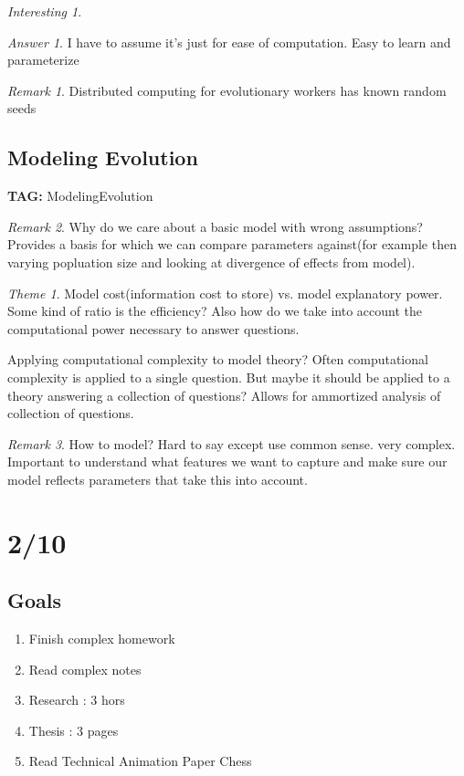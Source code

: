\documentclass[11pt]{article}
\theoremstyle{remark}
\newtheorem{remark}{Remark}
\newtheorem{ans}{Answer}
\newtheorem{interest}{Interesting}
\newtheorem{theme}{Theme}
\begin{document}
\begin{interest}
\begin{ans}
	 I have to assume it's just for ease of computation. Easy to learn and parameterize
\end{ans}

\begin{remark}
	Distributed computing for evolutionary workers has known random seeds
\end{remark}

\subsection{Modeling Evolution}

\textbf{TAG:} ModelingEvolution

\begin{remark}
	Why do we care about a basic model with wrong assumptions? Provides a basis for which we can compare parameters against(for example then varying popluation size and looking at divergence of effects from model).
\end{remark}

\begin{theme}
	Model cost(information cost to store) vs. model explanatory power. Some kind of ratio is the efficiency? Also how do we take into account the computational power necessary to answer questions.

	Applying computational complexity to model theory? Often computational complexity is applied to a single question. But maybe it should be applied to a theory answering a collection of questions? Allows for ammortized analysis of collection of questions.
\end{theme}

\begin{remark}
	How to model? Hard to say except use common sense. very complex. Important to understand what features we want to capture and make sure our model reflects parameters that take this into account.
\end{remark}

\section{2/10}

\subsection{Goals}

\begin{enumerate}
	\item Finish complex homework
	\item Read complex notes	
	\item Research : 3 hors
	\item Thesis : 3 pages
	\item Read Technical Animation Paper
	 Chess
\end{enumerate}


\end{interest}
\end{document}
